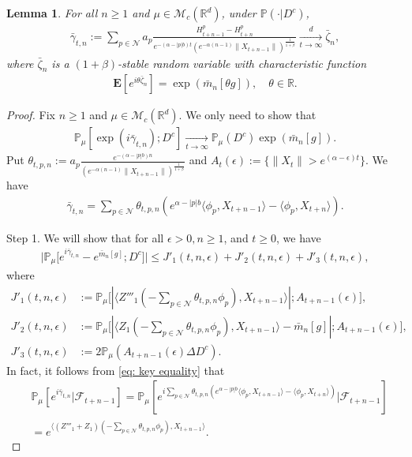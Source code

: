 \documentclass[12pt,a4paper]{amsart}
\theoremstyle{plain}
\newtheorem{lem}[thm]{Lemma}
\theoremstyle{definition}
\numberwithin{equation}{section}
\begin{document}
\begin{lem}\label{large-central}
    For all $n\ge 1$ and $\mu\in\mathcal{M}_c(\mathbb{R}^d)$, under $\mathbb{P}(\cdot|D^c)$,
\begin{align}
    \bar{\gamma}_{t,n}:=\sum_{p\in\mathcal{N}}a_p\frac{H^p_{t+n-1}-H^p_{t+n}}{e^{-(\alpha-|p|b)t}(e^{-\alpha(n-1)}\|X_{t+n-1}\|)^{\frac{1}{1+\beta}}}
    \xrightarrow[t\to \infty]{d}\bar{\zeta}_n,
\end{align}
	where $\bar{\zeta}_n$ is a $(1+\beta)$-stable random variable with
    characteristic function
\begin{align}
    \mathbf{E}[e^{i\theta \bar{\zeta}_n}]=\exp(\bar{m}_n[\theta g]),\quad \theta\in \mathbb{R}.
\end{align}
\end{lem}
\begin{proof}
    Fix $n\ge 1$ and $\mu\in\mathcal{M}_c(\mathbb{R}^d)$.
    We only need to show that
\begin{align}
    \mathbb{P}_{\mu}[\exp(i\bar{\gamma}_{t,n}); D^c]
    \xrightarrow[t\rightarrow \infty]{}\mathbb{P}_{\mu}(D^c)\exp(\bar{m}_n[g]).
\end{align}
    Put $\theta_{t,p,n}:=a_p\frac{e^{-(\alpha-|p|b)n}}{(e^{-\alpha(n-1)}\|X_{t+n-1}\|)^{\frac{1}{1+\beta}}}$ and
    $A_t(\epsilon):=\{\|X_t\| > e^{(\alpha-\epsilon)t}\}$.
    We have
\begin{align}
    \bar{\gamma}_{t,n}=\sum_{p\in \mathcal{N}}\theta_{t,p,n}(e^{\alpha-|p|b}\langle \phi_p, X_{t+n-1}\rangle-\langle \phi_p, X_{t+n}\rangle).
\end{align}

	Step 1. We will show that for all $\epsilon > 0, n\geq 1$, and $t\geq 0$, we have
\begin{align}
    \big|\mathbb{P}_{\mu}\big[e^{i\bar{\gamma}_{t,n}}-e^{\bar{m}_n[g]}; D^c\big]\big|
    \leq J'_1(t,n,\epsilon)+J'_2(t,n,\epsilon)+J'_3(t,n,\epsilon),
\end{align}
	where
\begin{align}
\label{eq: Def of JJ1}
	J'_1(t,n,\epsilon)
    &:= \mathbb{P}_{\mu}\big[|\langle Z'''_1(-\sum_{p\in \mathcal{N}}\theta_{t,p,n}\phi_p), X_{t+n-1}\rangle|; A_{t+n-1}(\epsilon) \big],
	\\ J'_2(t,n,\epsilon)
	&:= \mathbb{P}_{\mu}\big[|\langle Z_1(-\sum_{p\in \mathcal{N}}\theta_{t,p,n}\phi_p),X_{t+n-1}\rangle-\bar{m}_n[g]|; A_{t+n-1}(\epsilon)\big],
	\\ J'_3(t,n, \epsilon)
	&:=2\mathbb{P}_{\mu}(A_{t+n-1}(\epsilon)\Delta D^c).
\end{align}
    In fact, it follows from \eqref{eq: key equality} that
\begin{align}
\label{eq: need11}
    &\displaystyle\mathbb{P}_{\mu}[e^{i\bar{\gamma}_{t,n}}|\mathscr{F}_{t+n-1}]
    =\mathbb{P}_{\mu}[e^{i\sum_{p\in \mathcal{N}}\theta_{t,p,n}(e^{\alpha-|p|b}\langle \phi_p,X_{t+n-1}\rangle-\langle \phi_p, X_{t+n}\rangle)}|\mathscr{F}_{t+n-1}]
    \\&=\displaystyle e^{\langle (Z'''_1+Z_1)(-\sum_{p\in \mathcal{N}}\theta_{t,p,n}\phi_p), X_{t+n-1} \rangle}.
\end{align}


\end{proof}
\end{document}
